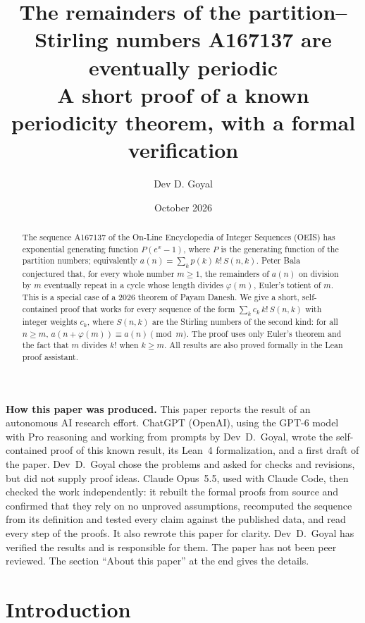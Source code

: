 \documentclass[11pt,a4paper]{article}
\title{The remainders of the partition--Stirling numbers A167137 are eventually periodic\\[6pt]\large A short proof of a known periodicity theorem, with a formal verification}
\author{Dev D. Goyal}
\date{October 2026}
\theoremstyle{definition}
\theoremstyle{remark}
\begin{document}
\maketitle
\begin{abstract}
The sequence A167137 of the On-Line Encyclopedia of Integer Sequences (OEIS) has exponential generating function $P(e^x-1)$, where $P$ is the generating function of the partition numbers; equivalently $a(n)=\sum_kp(k)\,k!\,S(n,k)$. Peter Bala conjectured that, for every whole number $m\ge1$, the remainders of $a(n)$ on
division by $m$ eventually repeat in a cycle whose length divides $\varphi(m)$, Euler's totient of $m$. This is a special
case of a 2026 theorem of Payam Danesh. We give a short, self-contained proof that works for every sequence of the form
$\sum_k c_k\,k!\,S(n,k)$ with integer weights $c_k$, where $S(n,k)$ are the Stirling numbers of the second kind: for all
$n\ge m$, $a(n+\varphi(m))\equiv a(n)\pmod m$. The proof uses only Euler's theorem and the fact that $m$ divides $k!$
when $k\ge m$. All results are also proved formally in the Lean proof assistant.
\end{abstract}
\begin{center}\begin{minipage}{0.88\linewidth}\small
\textbf{How this paper was produced.} This paper reports the result of an autonomous AI research effort.
ChatGPT (OpenAI), using the GPT-6 model with Pro reasoning and working from prompts by Dev~D.~Goyal, wrote the self-contained proof of this known result, its Lean~4 formalization, and a first draft of the paper.
Dev~D.~Goyal chose the problems and asked for checks and revisions, but did not supply proof ideas.
Claude Opus~5.5, used with Claude Code, then checked the work independently: it rebuilt the formal proofs from
source and confirmed that they rely on no unproved assumptions, recomputed the sequence from its definition and tested
every claim against the published data, and read every step of the proofs. It also rewrote this paper for clarity.
Dev~D.~Goyal has verified the results and is responsible for them. The paper has not been peer reviewed.
The section ``About this paper'' at the end gives the details.
\end{minipage}\end{center}

\section{Introduction}
\end{document}
